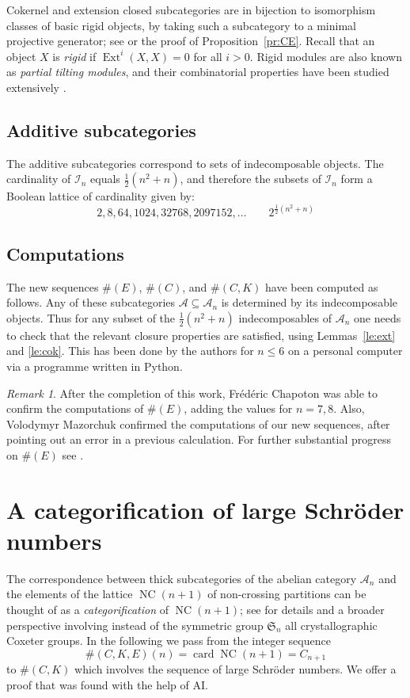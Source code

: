 \documentclass[a4paper]{amsart}
\theoremstyle{plain}
\theoremstyle{definition}
\theoremstyle{remark}
\newtheorem{rem}[thm]{Remark}
\numberwithin{equation}{section}
\newcommand{\card}{\operatorname{card}}
\newcommand{\Ext}{\operatorname{Ext}}
\newcommand{\NC}{\operatorname{NC}}
\def\A{\mathcal A}
\def\I{\mathcal I}
\begin{document}
Cokernel and extension closed subcategories are in bijection to
isomorphism classes of basic rigid objects, by taking such a
subcategory to a minimal projective generator; see
\cite[Theorem~A]{En2022} or the proof of
Proposition~\ref{pr:CE}. Recall that an object $X$ is \emph{rigid} if
$\Ext^i(X,X)=0$ for all $i>0$. Rigid modules are also known as
\emph{partial tilting modules}, and their combinatorial properties
have been studied extensively \cite{MRZ2003,RS1991}.

\subsection*{Additive subcategories}

The additive subcategories correspond to sets of indecomposable
objects. The cardinality of $\I_n$ equals $\frac{1}{2} (n^2 +n)$, and therefore the subsets of
$\I_n$ form a Boolean lattice of cardinality given by:
\[2, 8, 64, 1024, 32768, 2097152,\ldots \qquad 2^{\frac{1}{2} (n^2
    +n)}\tag*{$\#(\varnothing)$}\]


\subsection*{Computations}

The new sequences $\#(E)$, $\#(C)$, and $\#(C,K)$ have been computed
as follows. Any of these subcategories $\A\subseteq\A_n$ is determined
by its indecomposable objects. Thus for any subset of the
${\frac{1}{2} (n^2 +n)}$ indecomposables of $\A_n$ one needs to check that the
relevant closure properties are satisfied, using Lemmas~\ref{le:ext}
and \ref{le:cok}. This has been done by the authors for $n\le 6$ on a
personal computer via a programme written in Python.

\begin{rem}
  After the completion of this work, Frédéric Chapoton was able to
  confirm the computations of $\#(E)$, adding the values for
  $n=7,8$. Also, Volodymyr Mazorchuk confirmed the computations of
  our new sequences, after pointing out an error in a previous
  calculation. For further substantial progress on $\#(E)$ see
  \cite{Ma2026}.
\end{rem}

\section{A categorification of large Schröder numbers}

The correspondence between thick subcategories of the abelian category
$\A_n$ and the elements of the lattice $\NC(n+1)$ of non-crossing
partitions can be thought of as a \emph{categorification} of
$\NC(n+1)$; see \cite{HK2016} for details and a broader
perspective involving instead of the symmetric group $\mathfrak S_n$ all crystallographic
Coxeter groups. In the following we pass from the integer sequence
\[\#(C,K,E)(n)=\card \NC(n+1)=C_{n+1}\] to  $\#(C,K)$ which involves the
sequence of large Schröder numbers. We offer a proof that was found
with the help of AI.
\end{document}
